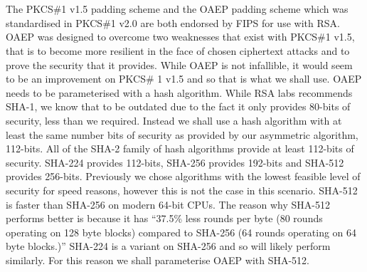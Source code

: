 \documentclass[12pt, titlepage]{article}
\begin{document}
\\
\\
The PKCS\#1 v1.5 padding scheme and the OAEP padding scheme which was standardised in PKCS\#1 v2.0 are both endorsed by FIPS for use with RSA. OAEP was designed to overcome two weaknesses that exist with PKCS\#1 v1.5, that is to become more resilient in the face of chosen ciphertext attacks and to prove the security that it provides. While OAEP is not infallible\cite{oaepAttack}, it would seem to be an improvement on PKCS\# 1 v1.5 and so that is what we shall use.
\newline \indent OAEP needs to be parameterised with a hash algorithm. While RSA labs recommends SHA-1, we know that to be outdated due to the fact it only provides 80-bits of security, less than we required. Instead we shall use a hash algorithm with at least the same number bits of security as provided by our asymmetric algorithm, 112-bits. All of the SHA-2 family of hash algorithms provide at least 112-bits of security. SHA-224 provides 112-bits, SHA-256 provides 192-bits and SHA-512 provides 256-bits. Previously we chose algorithms with the lowest feasible level of security for speed reasons, however this is not the case in this scenario. SHA-512 is faster than SHA-256 on modern 64-bit CPUs. The reason why SHA-512 performs better is because it has ``37.5\% less rounds per byte (80 rounds operating on 128 byte blocks) compared to SHA-256 (64 rounds operating on 64 byte blocks.)''\cite{sha512Faster} SHA-224 is a variant on SHA-256 and so will likely perform similarly. For this reason we shall parameterise OAEP with SHA-512.
\end{document}
